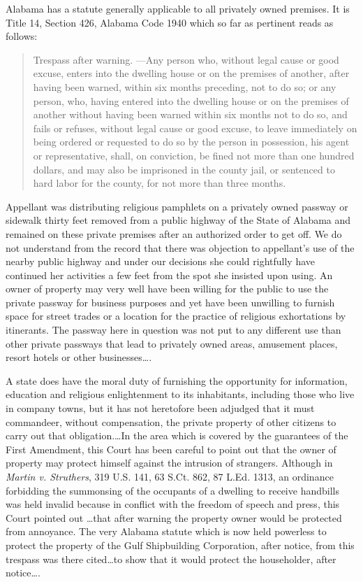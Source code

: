 Alabama has a statute generally applicable to all privately owned premises. It
is Title 14, Section 426, Alabama Code 1940 which so far as pertinent reads as
follows:
\begin{quote}
Trespass after warning. ---Any person who, without legal cause or
good excuse, enters into the dwelling house or on the premises of another, after
having been warned, within six months preceding, not to do so; or any person,
who, having entered into the dwelling house or on the premises of another
without having been warned within six months not to do so, and fails or refuses,
without legal cause or good excuse, to leave immediately on being ordered or
requested to do so by the person in possession, his agent or representative,
shall, on conviction, be fined not more than one hundred dollars, and may also
be imprisoned in the county jail, or sentenced to hard labor for the county, for
not more than three months.
\end{quote}
Appellant was distributing religious pamphlets on a privately owned passway or
sidewalk thirty feet removed from a public highway of the State of Alabama and
remained on these private premises after an authorized order to get off. We do
not understand from the record that there was objection to appellant's use of
the nearby public highway and under our decisions she could rightfully have
continued her activities a few feet from the spot she insisted upon using. An
owner of property may very well have been willing for the public to use the
private passway for business purposes and yet have been unwilling to furnish
space for street trades or a location for the practice of religious
exhortations by itinerants. The passway here in question was not put to any
different use than other private passways that lead to privately owned areas,
amusement places, resort hotels or other businesses\ldots.

A state does have the moral duty of furnishing the opportunity for information,
education and religious enlightenment to its inhabitants, including those who
live in company towns, but it has not heretofore been adjudged that it must
commandeer, without compensation, the private property of other citizens to
carry out that obligation.\ldots  In the area which is covered by the
guarantees of the First Amendment, this Court has been careful to point out
that the owner of property may protect himself against the intrusion of
strangers. Although in \textit{Martin v. Struthers}, 319 U.S. 141, 63 S.Ct.
862, 87 L.Ed. 1313, an ordinance forbidding the summonsing of the occupants of
a dwelling to receive handbills was held invalid because in conflict with the
freedom of speech and press, this Court pointed out \ldots  that after warning
the property owner would be protected from annoyance.  The very Alabama statute
which is now held powerless to protect the property of the Gulf Shipbuilding
Corporation, after notice, from this trespass was there cited\ldots to show
that it would protect the householder, after notice\ldots.

